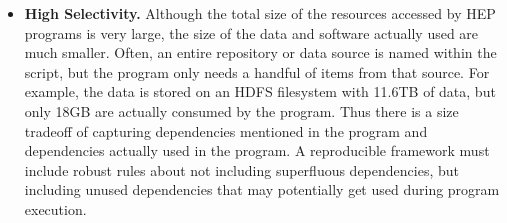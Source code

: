\begin{itemize}

\item {\bf High Selectivity.}  
Although the total size of the resources accessed by HEP
programs is very large, the size of the data and software actually used are much smaller.
Often, an entire repository or data source is named within the script, but the program
only needs a handful of items from that source.  For example, the data is stored on an
HDFS filesystem with 11.6TB of data, but only 18GB are actually consumed by the program. 
Thus there is a size tradeoff of capturing dependencies mentioned in the program and dependencies actually used in the program.
A reproducible framework must include robust rules about not including superfluous dependencies, but including unused dependencies that may potentially get used during program execution.  


\end{itemize}
